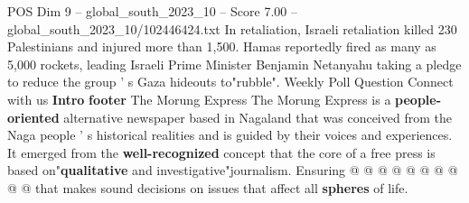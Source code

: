 \begin{textsample}{POS Dim 9 – global\_south\_2023\_10 – Score 7.00 – global\_south\_2023\_10/102446424.txt}
In retaliation, Israeli retaliation killed 230 Palestinians and injured more than 1,500.
Hamas reportedly fired as many as 5,000 rockets, leading Israeli Prime Minister Benjamin Netanyahu taking a pledge to reduce the group ' s Gaza hideouts to"rubble".
Weekly Poll Question Connect with us \textbf{Intro} \textbf{footer} The Morung Express The Morung Express is a \textbf{people-oriented} alternative newspaper based in Nagaland that was conceived from the Naga people ' s historical realities and is guided by their voices and experiences.
It emerged from the \textbf{well-recognized} concept that the core of a free press is based on"\textbf{qualitative} and investigative"journalism.
Ensuring @ @ @ @ @ @ @ @ @ @ that makes sound decisions on issues that affect all \textbf{spheres} of life.

\end{textsample}
